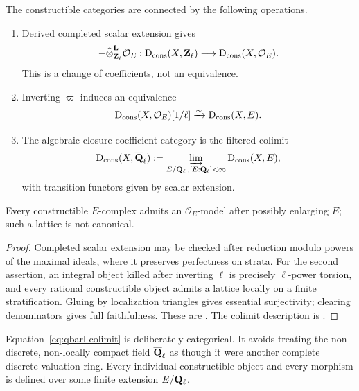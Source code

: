 \begin{theorem}
\label{thm:proetale-coefficient-tower}
The constructible categories are connected by the following operations.
\begin{enumerate}
\item Derived completed scalar extension gives
\[
  -\widehat\otimes^{\mathbf L}_{\mathbf Z_\ell}\mathcal O_E:
  \mathrm D_{\mathrm{cons}}(X,\mathbf Z_\ell)\longrightarrow\mathrm D_{\mathrm{cons}}(X,\mathcal O_E).
\]
This is a change of coefficients, not an equivalence.
\item Inverting \(\varpi\) induces an equivalence
\begin{equation}
\label{eq:oe-to-e}
  \mathrm D_{\mathrm{cons}}(X,\mathcal O_E)[1/\ell]
     \xrightarrow{\sim}\mathrm D_{\mathrm{cons}}(X,E).
\end{equation}
\item The algebraic-closure coefficient category is the filtered colimit
\begin{equation}
\label{eq:qbarl-colimit}
  \mathrm D_{\mathrm{cons}}(X,\overline{\mathbf Q}_\ell)
    :=\varinjlim_{E/\mathbf Q_\ell\,, [E:\mathbf Q_\ell]<\infty}\mathrm D_{\mathrm{cons}}(X,E),
\end{equation}
with transition functors given by scalar extension.
\end{enumerate}
Every constructible \(E\)-complex admits an \(\mathcal O_E\)-model after
possibly enlarging \(E\); such a lattice is not canonical.
\end{theorem}

\begin{proof}
Completed scalar extension may be checked after reduction modulo powers of
the maximal ideals, where it preserves perfectness on strata.  For the second
assertion, an integral object killed after inverting \(\ell\) is precisely
\(\ell\)-power torsion, and every rational constructible object admits a
lattice locally on a finite stratification.  Gluing by localization triangles
gives essential surjectivity; clearing denominators gives full faithfulness.
These are \cite[Proposition~6.8.4, Lemma~6.8.13, and
Proposition~6.8.14]{BhattScholzeProEtale}.  The colimit description is
\cite[Lemma~7.9]{HRSConstructible}.
\end{proof}

\begin{remark}
Equation~\eqref{eq:qbarl-colimit} is deliberately categorical.  It avoids
treating the non-discrete, non-locally compact field \(\overline{\mathbf Q}_\ell\) as though it
were another complete discrete valuation ring.  Every individual
constructible object and every morphism is defined over some finite
extension \(E/\mathbf Q_\ell\).
\end{remark}

